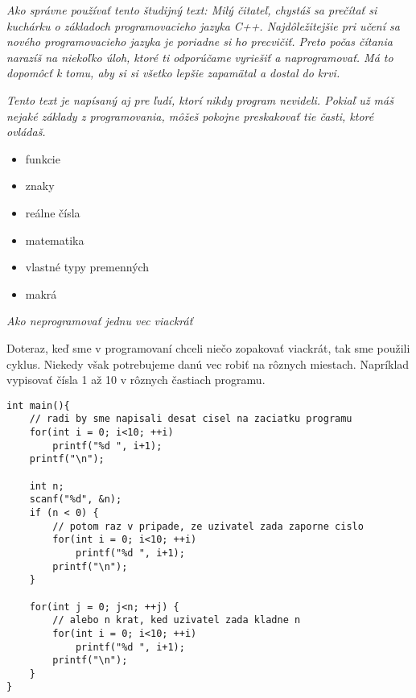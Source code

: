 




\textit{Ako správne používať tento študijný text: Milý čitateľ, chystáš sa
prečítať si kuchárku o základoch programovacieho jazyka C++. Najdôležitejšie
pri učení sa nového programovacieho jazyka je poriadne si ho precvičiť. Preto
počas čítania narazíš na niekoľko úloh, ktoré ti odporúčame vyriešiť a
naprogramovať.  Má to dopomôcť k tomu, aby si si všetko lepšie zapamätal a dostal
do krvi.}

\textit{Tento text je napísaný aj pre ľudí, ktorí nikdy program nevideli. Pokiaľ
už máš nejaké základy z programovania, môžeš pokojne preskakovať tie časti,
ktoré ovládaš.}

\begin{itemize}
    \vspace{-8pt}
    \item funkcie
    \vspace{-5pt}
    \item znaky
    \vspace{-5pt}
    \item reálne čísla
    \vspace{-5pt}
    \item matematika
    \vspace{-5pt}
    \item vlastné typy premenných
    \vspace{-5pt}
    \item makrá
\end{itemize}

\medskip


\textit{Ako neprogramovať jednu vec viackráť}

Doteraz, keď sme v programovaní chceli niečo zopakovať viackrát, tak
sme použili cyklus. Niekedy však potrebujeme danú vec robiť na rôznych miestach.
Napríklad vypisovať čísla 1 až 10 v rôznych častiach programu.

\begin{lstlisting}
int main(){
    // radi by sme napisali desat cisel na zaciatku programu
    for(int i = 0; i<10; ++i)
        printf("%d ", i+1);
    printf("\n");

    int n;
    scanf("%d", &n);
    if (n < 0) {
        // potom raz v pripade, ze uzivatel zada zaporne cislo
        for(int i = 0; i<10; ++i)
            printf("%d ", i+1);
        printf("\n");
    }

    for(int j = 0; j<n; ++j) {
        // alebo n krat, ked uzivatel zada kladne n
        for(int i = 0; i<10; ++i)
            printf("%d ", i+1);
        printf("\n");        
    }
}
\end{lstlisting}

